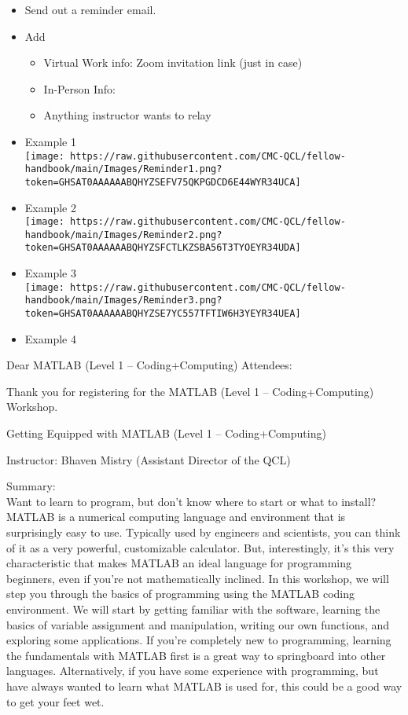 \documentclass[
]{book}
\providecommand{\tightlist}{%
  \setlength{\itemsep}{0pt}\setlength{\parskip}{0pt}}
\begin{document}
\begin{itemize}
\item
  Send out a reminder email.
\item
  Add

  \begin{itemize}
  \tightlist
  \item
    Virtual Work info: Zoom invitation link (just in case)
  \item
    In-Person Info:
  \item
    Anything instructor wants to relay
  \end{itemize}
\item
  Example 1\\
  \texttt{[image: https://raw.githubusercontent.com/CMC-QCL/fellow-handbook/main/Images/Reminder1.png?token=GHSAT0AAAAAABQHYZSEFV75QKPGDCD6E44WYR34UCA]}
\item
  Example 2\\
  \texttt{[image: https://raw.githubusercontent.com/CMC-QCL/fellow-handbook/main/Images/Reminder2.png?token=GHSAT0AAAAAABQHYZSFCTLKZSBA56T3TYOEYR34UDA]}
\item
  Example 3\\
  \texttt{[image: https://raw.githubusercontent.com/CMC-QCL/fellow-handbook/main/Images/Reminder3.png?token=GHSAT0AAAAAABQHYZSE7YC557TFTIW6H3YEYR34UEA]}
\item
  Example 4
\end{itemize}

Dear MATLAB (Level 1 -- Coding+Computing) Attendees:

Thank you for registering for the MATLAB (Level 1 -- Coding+Computing) Workshop.

Getting Equipped with MATLAB (Level 1 -- Coding+Computing)

Instructor: Bhaven Mistry (Assistant Director of the QCL)

Summary:\\
Want to learn to program, but don't know where to start or what to install? MATLAB is a numerical computing language and environment that is surprisingly easy to use. Typically used by engineers and scientists, you can think of it as a very powerful, customizable calculator. But, interestingly, it's this very characteristic that makes MATLAB an ideal language for programming beginners, even if you're not mathematically inclined.
In this workshop, we will step you through the basics of programming using the MATLAB coding environment. We will start by getting familiar with the software, learning the basics of variable assignment and manipulation, writing our own functions, and exploring some applications. If you're completely new to programming, learning the fundamentals with MATLAB first is a great way to springboard into other languages. Alternatively, if you have some experience with programming, but have always wanted to learn what MATLAB is used for, this could be a good way to get your feet wet.
\end{document}

